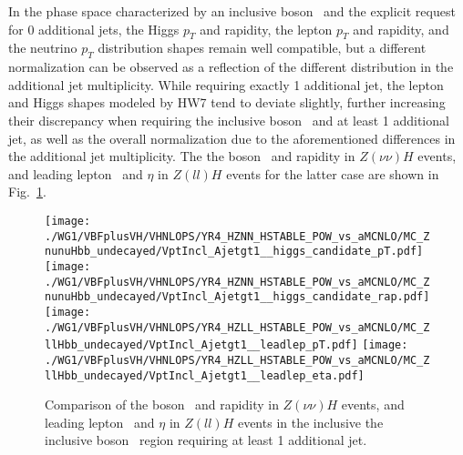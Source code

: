 In the phase space characterized by an inclusive boson \pt\ and the explicit request for 0 additional jets,
the Higgs $p_T$ and rapidity, the lepton $p_T$ and rapidity, and the neutrino $p_T$
distribution shapes remain well compatible, but a different normalization can be observed as a reflection of the
different distribution in the additional jet multiplicity.
While requiring exactly 1 additional jet,
the lepton and Higgs \pt shapes modeled by HW7 tend to deviate slightly,
further increasing their discrepancy 
when requiring the inclusive boson \pt\ and at least 1 additional jet,
as well as the overall normalization due to the aforementioned differences in the additional jet multiplicity.
The the boson \pt\ and rapidity in $Z(\nu\nu)H$ events, and leading lepton \pt\ and $\eta$ in $Z(ll)H$ events 
for the latter case are shown in Fig.~\ref{fig:stable__gt1j_hig}.
\begin{figure}[hptb]
\centering
\texttt{[image: ./WG1/VBFplusVH/VHNLOPS/YR4\_HZNN\_HSTABLE\_POW\_vs\_aMCNLO/MC\_ZnunuHbb\_undecayed/VptIncl\_Ajetgt1\_\_higgs\_candidate\_pT.pdf]}
\texttt{[image: ./WG1/VBFplusVH/VHNLOPS/YR4\_HZNN\_HSTABLE\_POW\_vs\_aMCNLO/MC\_ZnunuHbb\_undecayed/VptIncl\_Ajetgt1\_\_higgs\_candidate\_rap.pdf]}
\texttt{[image: ./WG1/VBFplusVH/VHNLOPS/YR4\_HZLL\_HSTABLE\_POW\_vs\_aMCNLO/MC\_ZllHbb\_undecayed/VptIncl\_Ajetgt1\_\_leadlep\_pT.pdf]}
\texttt{[image: ./WG1/VBFplusVH/VHNLOPS/YR4\_HZLL\_HSTABLE\_POW\_vs\_aMCNLO/MC\_ZllHbb\_undecayed/VptIncl\_Ajetgt1\_\_leadlep\_eta.pdf]}
\caption{Comparison of the boson \pt\ and rapidity in $Z(\nu\nu)H$ events, and leading lepton \pt\ and $\eta$ in $Z(ll)H$ events in the inclusive 
the inclusive boson \pt\ region requiring at least 1 additional jet.}
\label{fig:stable__gt1j_hig}
\end{figure}

